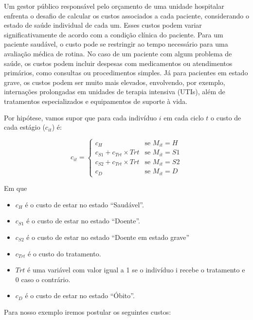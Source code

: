 \documentclass[12pt]{article}
\theoremstyle{break}
\begin{document}
Um gestor público responsável pelo orçamento de uma unidade hospitalar enfrenta o desafio de calcular os custos associados a cada paciente, considerando o estado de saúde individual de cada um. Esses custos podem variar significativamente de acordo com a condição clínica do paciente. Para um paciente saudável, o custo pode se restringir ao tempo necessário para uma avaliação médica de rotina. No caso de um paciente com algum problema de saúde, os custos podem incluir despesas com medicamentos ou atendimentos primários, como consultas ou procedimentos simples. Já para pacientes em estado grave, os custos podem ser muito mais elevados, envolvendo, por exemplo, internações prolongadas em unidades de terapia intensiva (UTIs), além de tratamentos especializados e equipamentos de suporte à vida.



Por hipótese, vamos supor que para cada indivíduo \( i \) em cada ciclo \( t \) o custo de cada estágio ($c_{it}$) é:

    \[
    c_{it} =
    \begin{cases} 
      c_H & \text{se } M_{it} = H \\
      c_{S1} + c_{Trt} \times Trt & \text{se } M_{it} = S1 \\
      c_{S2} + c_{Trt} \times Trt & \text{se } M_{it} = S2 \\
      c_D & \text{se } M_{it} = D 
    \end{cases}
    \]

Em que 

\begin{itemize}
    \item $c_H$ é o custo de estar no estado ``Saudável''.  
    \item $c_{S1}$ é o custo de estar no estado ``Doente''. 

    \item $c_{S2}$ é o custo de estar no estado ``Doente em estado grave''

    \item $c_{Trt}$ é o custo do tratamento.

    \item  $Trt$ é uma variável com valor igual a 1 se o indivíduo i recebe o tratamento e 0 caso o contrário.

    \item $c_{D}$ é o custo de estar no estado ``Óbito''. 
\end{itemize}


Para nosso exemplo iremos postular os seguintes custos:
\end{document}
